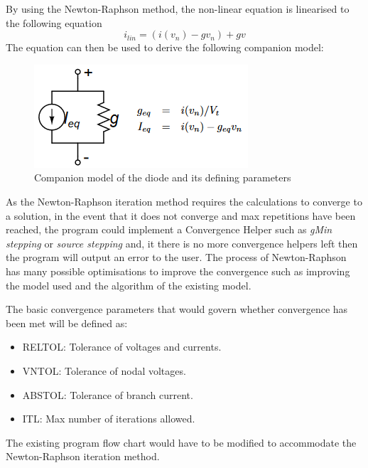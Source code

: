 \documentclass[12pt,a4paper]{article}
\begin{document}
By using the Newton-Raphson method, the non-linear equation is linearised to the following equation\cite{companion}
$$i_{lin} = (i(v_n)-gv_n) + gv$$
The equation can then be used to derive the following companion model:

\begin{figure} [h!]
	\centering
	\includegraphics[]{diode_model.PNG}
	\caption{Companion model of the diode and its defining parameters \cite{companion}}
\end{figure}
As the Newton-Raphson iteration method requires the calculations to converge to a solution, in the event that it does not
converge and max repetitions have been reached, the program could implement a Convergence Helper such as \textit{gMin stepping} or
\textit{source stepping} and, it there is no more convergence helpers left then the program will output an error to the user.
The process of Newton-Raphson has many 
possible optimisations to improve the convergence such as improving the model used and the algorithm of the existing model. \par
\par 
The basic convergence parameters that would govern whether convergence has been met will be defined as:
\begin{itemize}
	\item RELTOL: Tolerance of voltages and currents.
	\item VNTOL: Tolerance of nodal voltages.
	\item ABSTOL: Tolerance of branch current.
	\item ITL: Max number of iterations allowed.
\end{itemize} 
The existing program flow chart would have to be modified to accommodate the Newton-Raphson iteration method. 
\end{document}

